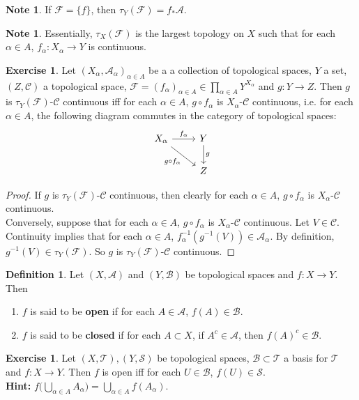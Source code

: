\documentclass[12pt]{amsart}
\theoremstyle{definition}
\newtheorem{defn}[definition]{Definition}
\newtheorem{note}[definition]{Note}
\newtheorem{ex}[definition]{Exercise}
\newcommand{\al}{\alpha}
\newcommand{\MA}{\mathcal{A}}
\newcommand{\MC}{\mathcal{C}}
\newcommand{\MB}{\mathcal{B}}
\newcommand{\MF}{\mathcal{F}}
\newcommand{\MS}{\mathcal{S}}
\newcommand{\MT}{\mathcal{T}}
\newcommand{\ld}[1]{\label{defn:#1}}
\begin{document}
	\begin{note}
	If $\MF = \{f\}$, then $\tau_Y(\MF) = f_*\MA$.
	\end{note}
	
	\begin{note}
	Essentially, $\tau_X(\MF)$ is the largest topology on $X$ such that for each $\al \in A$, $f_{\al}:X_{\al} \rightarrow Y$ is continuous. 
	\end{note}
	
	\begin{ex}
	Let $(X_{\al}, \MA_{\al})_{\al \in A}$ be a a collection of topological spaces, $Y$ a set, $(Z, \MC)$ a topological space, $\MF = (f_{\al})_{\al \in A} \in \prod \limits_{\al \in A}Y^{X_{\al}}$ and $g: Y \rightarrow Z$. Then $g$ is $\tau_Y(\MF)$-$\MC$ continuous iff for each $\al \in A$, $g \circ f_{\al}$ is $X_{\al}$-$\MC$ continuous, i.e. for each $\al \in A$, the following diagram commutes in the category of topological spaces: 
	\[ \begin{tikzcd}
	X_{\al} \arrow[r, "f_{\al}"] \arrow[dr, "g \circ f_{\al}"'] 	
	& Y  \arrow[d, "g"] \\
	& Z 
\end{tikzcd}
	\]
	\end{ex}
	
	\begin{proof}
	If $g$ is $\tau_Y(\MF)$-$\MC$ continuous, then clearly for each $\al \in A$, $g \circ f_{\al}$ is $X_{\al}$-$\MC$ continuous. \\
	Conversely, suppose that for each $\al \in A$, $g \circ f_{\al}$ is $X_{\al}$-$\MC$ continuous. Let $V \in \MC$. Continuity implies that for each $\al \in A$, $f_{\al}^{-1}(g^{-1}(V)) \in \MA_{\al}$. By definition, $g^{-1}(V) \in \tau_Y(\MF)$. So $g$ is $\tau_Y(\MF)$-$\MC$ continuous.
	\end{proof}
	
	\begin{defn} \ld{}
		Let $(X,\MA)$ and $(Y,\MB)$ be topological spaces and $f:X \rightarrow Y$. Then 
		\begin{enumerate}
			\item $f$ is said to be \textbf{open} if for each $A \in \MA$, $f(A) \in \MB$.
			\item $f$ is said to be \textbf{closed} if for each $A \subset X$, if $A^c \in \MA$, then $f(A)^c \in \MB$. 
		\end{enumerate}
	\end{defn}

	\begin{ex}
		Let $(X, \MT), (Y, \MS)$ be topological spaces, $\MB \subset \MT$ a basis for $\MT$ and $f: X \rightarrow Y$. Then $f$ is open iff for each $U \in \MB$, $f(U) \in \MS$.\\
		\textbf{Hint:} $f\bigg( \bigcup\limits_{\al \in A} A_{\al} \bigg) =  \bigcup\limits_{\al \in A} f(A_{\al})$.
	\end{ex}
\end{document}
